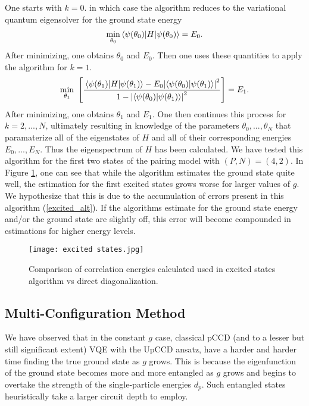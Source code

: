 \documentclass[10pt]{article}
\begin{document}
One starts with $k=0$. in which case the algorithm reduces to the variational quantum eigensolver for the ground state energy
\begin{align}
\underset{\theta_0}{\min}\mel{\psi(\theta_0)}{H}{\psi(\theta_0)}=E_0
.\end{align}
After minimizing, one obtains $\theta_0$ and $E_0$. Then one uses these quantities to apply the algorithm for $k=1$.
\begin{align}
\underset{\theta_1}{\min} \  \left[\frac{\mel{\psi(\theta_1)}{H}{\psi(\theta_1)}-E_0\abs{\bra{\psi(\theta_0)}\ket{\psi(\theta_1)}}^2}{1-\abs{\bra{\psi(\theta_0)}\ket{\psi(\theta_1)}}^2}\right]=E_1
.\end{align}
After minimizing, one obtains $\theta_1$ and $E_1$. One then continues this process for $k=2,...,N$, ultimately resulting in knowledge of the parameters $\theta_0,...,\theta_N$ that paramaterize all of the eigenstates of $H$ and all of their corresponding energies $E_0,...,E_N$. Thus the eigenspectrum of $H$ has been calculated. We have tested this algorithm for the first two states of the pairing model with $(P,N)=(4,2)$. In Figure \ref{fig:excited states}, one can see that while the algorithm estimates the ground state quite well, the estimation for the first excited states grows worse for larger values of $g$. We hypothesize that this is due to the accumulation of errors present in this algorithm (\ref{excited_alt}). If the algorithms estimate for the ground state energy and/or the ground state are slightly off, this error will become compounded in estimations for higher energy levels.

\begin{figure}
    \centering
    \texttt{[image: excited states.jpg]}
    \caption{Comparison of correlation energies calculated used in excited states algorithm vs direct diagonalization.}
    \label{fig:excited states}
\end{figure}

\subsection{Multi-Configuration Method}
\label{subsec:multi_conf}

We have observed that in the constant $g$ case, classical pCCD (and to a lesser but still significant extent) VQE with the UpCCD ansatz, have a harder and harder time finding the true ground state as $g$ grows. This is because the eigenfunction of the ground state becomes more and more entangled as $g$ grows and begins to overtake the strength of the single-particle energies $d_p$. Such entangled states heuristically take a larger circuit depth to employ.
\end{document}
